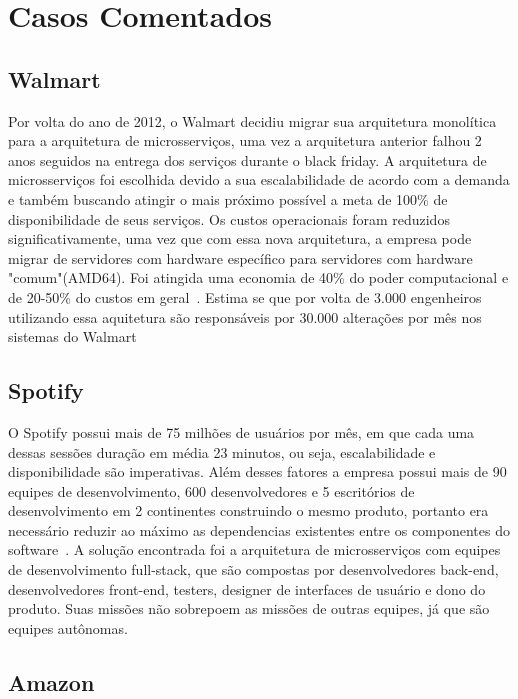 \chapter{Casos Comentados}
\label{cap2}

\section{Walmart}

Por volta do ano de 2012, o Walmart decidiu migrar sua arquitetura monolítica para a arquitetura de microsserviços, uma vez a arquitetura anterior falhou 2 anos seguidos na entrega dos serviços durante o black friday.
A arquitetura de microsserviços foi escolhida devido a sua escalabilidade de acordo com a demanda e também buscando atingir o mais próximo possível a meta de 100\% de disponibilidade de seus serviços.
Os custos operacionais foram reduzidos significativamente, uma vez que com essa nova arquitetura, a empresa pode migrar de servidores com hardware específico para servidores com hardware "comum"(AMD64). Foi atingida uma economia de 40\% do poder computacional e de 20-50\% do custos em geral~\cite{msWalmartSpotify}.
Estima se que por volta de 3.000 engenheiros utilizando essa aquitetura são responsáveis por 30.000 alterações por mês nos sistemas do Walmart~\cite{microservicesWalmart1}

\section{Spotify}

 O Spotify possui mais de 75 milhões de usuários por mês, em que cada uma dessas sessões duração em média 23 minutos, ou seja, escalabilidade e disponibilidade são imperativas.
Além desses fatores a empresa possui mais de 90 equipes de desenvolvimento, 600 desenvolvedores e 5 escritórios de desenvolvimento em 2 continentes construindo o mesmo produto, portanto era necessário reduzir ao máximo as dependencias existentes entre os componentes do software~\cite{msWalmartSpotify}.
A solução encontrada foi a arquitetura de microsserviços com equipes de desenvolvimento full-stack, que são compostas por desenvolvedores back-end, desenvolvedores front-end, testers, designer de interfaces de usuário e dono do produto. Suas missões não sobrepoem as missões de outras equipes, já que são equipes autônomas.

\section{Amazon}

